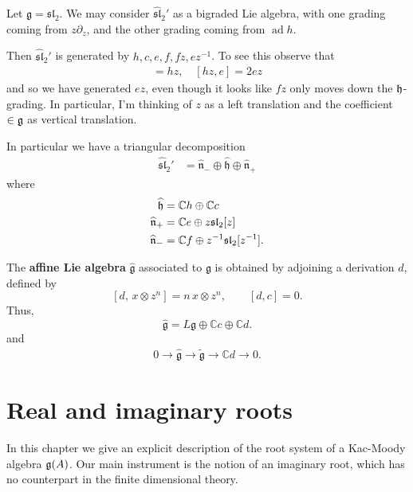 \documentclass[12pt]{article}
\begin{document}
\begin{example}
    Let $\mathfrak{g} = \mathfrak{sl}_2$. We may consider $\widehat{\mathfrak{sl}}_2'$ as a bigraded Lie algebra, with one grading coming from $z\partial_z$, and the other grading coming from $\operatorname{ad} h$.

    Then $\widehat{\mathfrak{sl}}_2'$ is generated by $h, c, e, f, fz, ez^{-1}$. To see this observe that \begin{align*}
        [fz,e] = hz, \quad [hz,e] = 2ez
    \end{align*} and so we have generated $ez$, even though it looks like $fz$ only moves down the $\mathfrak{h}$-grading. In particular, I'm thinking of $z$ as a left translation and the coefficient $\in \mathfrak{g}$ as vertical translation.

    In particular we have a triangular decomposition \begin{align*}
        \widehat{\mathfrak{sl}}_2' & = \widehat{\mathfrak{n}}_- \oplus \widehat{\mathfrak{h}} \oplus \widehat{\mathfrak{n}}_+
    \end{align*} where \begin{align*}
        \widehat{\mathfrak{h}}          & = \mathbb{C}h \oplus \mathbb{C}c                    \\
        \widehat{\mathfrak{n}}_+ & = \mathbb{C}e \oplus z\mathfrak{sl}_2[z]            \\
        \widehat{\mathfrak{n}}_- & = \mathbb{C}f \oplus z^{-1}\mathfrak{sl}_2[z^{-1}].
    \end{align*}
\end{example}

\begin{definition}
    The \textbf{affine Lie algebra} $\widehat{\mathfrak{g}}$ associated to $\mathfrak{g}$ is obtained by adjoining a derivation $d$, defined by
    \[
        [d,\, x \otimes z^n] = n\,x \otimes z^n,
        \qquad [d,c]=0.
    \]
    Thus,
    \[
        \widehat{\mathfrak{g}} = L\mathfrak{g} \oplus \mathbb{C}c \oplus \mathbb{C}d.
    \] and \begin{align*}
        0 \to \widehat{\mathfrak{g}} \to \widetilde{\mathfrak{g}} \to \mathbb{C}d \to 0.
    \end{align*}
\end{definition}

\section{Real and imaginary roots}
In this chapter we give an explicit description of the root system of a Kac-Moody algebra $\mathfrak{g}(A)$. Our main instrument is the notion of an
imaginary root, which has no counterpart in the finite dimensional theory.
\end{document}
